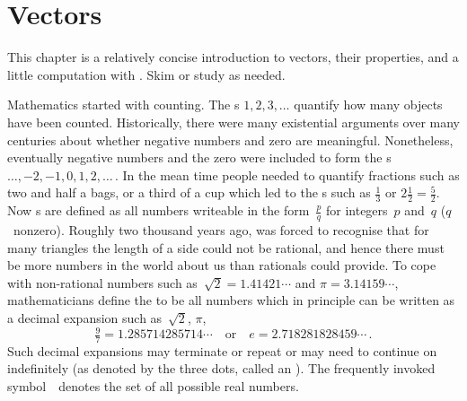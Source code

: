 
\chapter{Vectors}
\label{ch:v}

\minitoc

\begin{comment}
Introduce vectors, lines and planes, including adapting material from parts of Chapter~1 \pooliv{pp.1--55}, Chapter~2 (pre-\S2.1) of the book by \cite{Hopcroft2014},  \holti{\S2.1}, \larsvii{\S4.1} (short), et al.
Also Chapter~13 by \cite{HughesHallett2013}.
\end{comment}



\begin{aside}
This chapter is a relatively concise introduction to vectors, their properties, and a little computation with \script.  
Skim or study as needed.
\end{aside}%
Mathematics started with counting.
The s \(1,2,3,\ldots\) quantify how many objects have been counted.
Historically, there were many existential arguments over many centuries about whether negative numbers and zero are meaningful.
Nonetheless, eventually negative numbers and the zero were included to form the s \(\ldots,-2,-1,0,1,2,\ldots\)\,.
In the mean time people needed to quantify fractions such as two and 
half a bags, or a third of a cup which led to the s such as \(\tfrac13\) or \(2\tfrac12=\tfrac52\). 
Now s are defined as all numbers writeable in the form~\(\tfrac pq\) for integers~\(p\) and~\(q\) (\(q\)~nonzero).
Roughly two thousand years ago,  was forced to recognise that for many triangles the length of a side could not be rational, and hence there must be more numbers in the world about us than rationals could provide.
To cope with non-rational numbers such as~\(\sqrt2=1.41421\cdots\) and \(\pi=3.14159\cdots\), mathematicians define the  to be all numbers which in principle can be written as a decimal expansion such as~\(\sqrt2\), \(\pi\),
\begin{equation*}
\tfrac97=1.285714285714\cdots
\quad\text{or}\quad
e=2.718281828459\cdots\,.
\end{equation*}
Such decimal expansions may terminate or repeat or may need to continue on indefinitely (as denoted by the three dots, called an ).
The frequently invoked symbol~\RR\ denotes the set of all possible real numbers.


